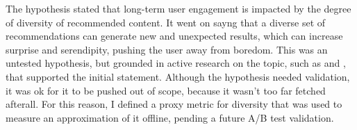The hypothesis stated that long-term user engagement is impacted by the degree of diversity of recommended content. It went on sayng that
a diverse set of recommendations can generate new and unexpected results, which can increase surprise and serendipity, pushing the user away from boredom.
This was an untested hypothesis, but grounded in active research on the topic, such as \cite{Kaminskas2016DiversitySN} and
\cite{duricic2023beyondaccuracyreviewdiversityserendipity}, that supported the initial statement. Although the hypothesis needed validation,
it was ok for it to be pushed out of scope, because it wasn't too far fetched afterall.
For this reason, I defined a proxy metric for diversity that was used to measure an approximation of it offline,
pending a future A/B test validation.
